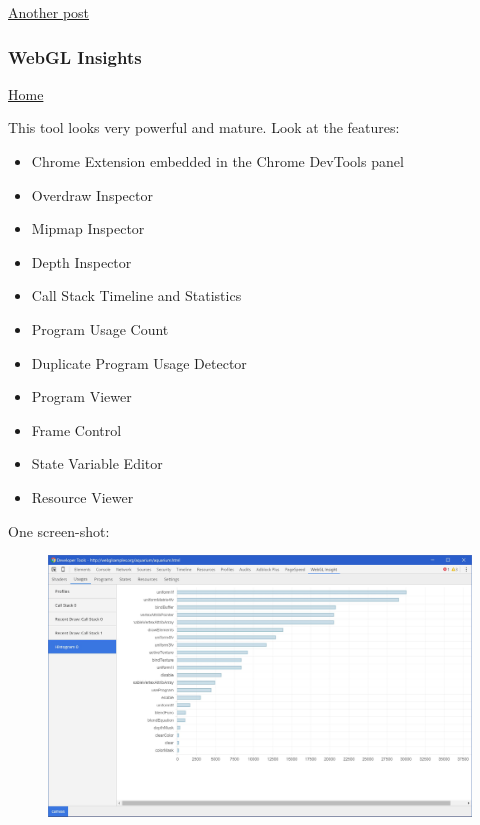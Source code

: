 \documentclass[]{article}
\begin{document}
\href{http://www.realtimerendering.com/blog/webgl-debugging-and-profiling-tools/}{Another
post}

\subsubsection{WebGL Insights}\label{webgl-insights}

\href{https://github.com/3Dparallax/insight}{Home}

This tool looks very powerful and mature. Look at the features:

\begin{itemize}
\itemsep1pt\parskip0pt
\item
  Chrome Extension embedded in the Chrome DevTools panel
\item
  Overdraw Inspector
\item
  Mipmap Inspector
\item
  Depth Inspector
\item
  Call Stack Timeline and Statistics
\item
  Program Usage Count
\item
  Duplicate Program Usage Detector
\item
  Program Viewer
\item
  Frame Control
\item
  State Variable Editor
\item
  Resource Viewer
\end{itemize}

One screen-shot:

\begin{figure}[htbp]
\centering
\includegraphics{images/inspector.jpeg}
\end{figure}
\end{document}
